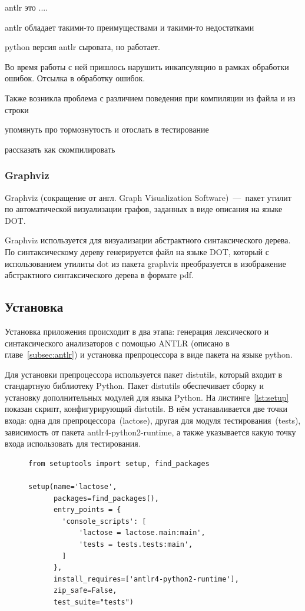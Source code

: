 \documentclass[12pt,a4paper,oneside]{extarticle}
\begin{document}
            antlr это ....

            antlr обладает такими-то преимуществами и такими-то недостатками

            python версия antlr сыровата, но работает.

            Во время работы с ней пришлось нарушить инкапсуляцию в рамках обработки ошибок. Отсылка в обработку ошибок.

            Также возникла проблема с различием поведения при компиляции из файла и из строки %

            упомянуть про тормознутость и отослать в тестирование

            рассказать как скомпилировать
        \subsubsection{Graphviz}
            Graphviz (сокращение от англ. Graph Visualization Software)~---~пакет утилит по автоматической визуализации графов, заданных в виде описания на языке DOT.

            Graphviz используется для визуализации абстрактного синтаксического дерева.
            По синтаксическому дереву генерируется файл на языке DOT, который с использованием утилиты dot из пакета graphviz преобразуется в изображение абстрактного синтаксического дерева в формате pdf.
    \clearpage

    \subsection{Установка}
        Установка приложения происходит в два этапа: генерация лексического и синтаксического анализаторов с помощью ANTLR (описано в главе~\ref{subsec:antlr}) и установка препроцессора в виде пакета на языке python.
        
        Для установки препроцессора используется пакет distutils, который входит в стандартную библиотеку Python.
        Пакет distutils обеспечивает сборку и установку дополнительных модулей для языка Python.
        На листинге~\ref{lst:setup} показан скрипт, конфигурирующий distutils.
        В нём устанавливается две точки входа: одна для препроцессора~(lactose), другая для модуля тестирования~(tests), зависимость от пакета antlr4-python2-runtime, а также указывается какую точку входа использовать для тестирования.

        \begin{figure}[h!]  
            \begin{lstlisting}[label={lst:setup},caption={Cкрипт конфигурации для утилиты distutils},captionpos=b]
from setuptools import setup, find_packages

setup(name='lactose',
      packages=find_packages(),
      entry_points = {
        'console_scripts': [
            'lactose = lactose.main:main',
            'tests = tests.tests:main',
        ]
      },
      install_requires=['antlr4-python2-runtime'],
      zip_safe=False,
      test_suite="tests")

            \end{lstlisting}
        \end{figure}
\end{document}
